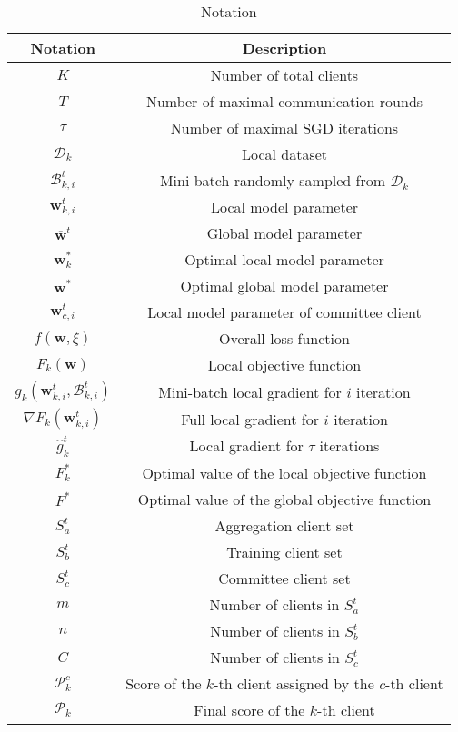 \documentclass[10pt,journal,compsoc]{IEEEtran}
\newcommand{\w}{\mathbf{w}}
\newcommand{\D}{\mathcal{D}}
\newcommand{\B}{\mathcal{B}}
\newcommand{\p}{\mathcal{P}}
\begin{document}
\begin{table}[h]
\caption{Notation}
\label{notation}
\centering
\begin{tabular}{c c}
\toprule
  Notation & Description \\
  \midrule
  $K$ & Number of total clients \\
  $T$ & Number of maximal communication rounds \\ 
  $\tau$ & Number of maximal SGD iterations\\
  $\D_k$ & Local dataset\\
  $\B_{k,i}^{t}$ & Mini-batch randomly sampled from $\D_k$\\
  $\w_{k,i}^{t}$ & Local model parameter\\
  $\overline{\w}^{t}$ & Global model parameter\\
  $\w_k^*$ & Optimal local model parameter\\
  $\w^*$ & Optimal global model parameter\\
  $\w_{c,i}^{t}$ & Local model parameter of committee client\\
  $f(\w,\xi)$ & Overall loss function\\
  $F_k(\w)$ & Local objective function\\
  $g_k(\w_{k,i}^{t},\B_{k,i}^{t})$ & Mini-batch local gradient for $i$ iteration\\
  $\nabla F_k(\w_{k,i}^{t})$ & Full local gradient for $i$ iteration\\
  $\hat{g}_k^t$ & Local gradient for $\tau$ iterations\\
  $F^*_k$ & Optimal value of the local objective function\\
  $F^*$ & Optimal value of the global objective function\\
  $S_a^{t}$ & Aggregation client set\\
  $S_b^{t}$ & Training client set\\
  $S_c^{t}$ & Committee client set\\
  $m$ & Number of clients in $S_a^{t}$\\
  $n$ & Number of clients in $S_b^{t}$\\
  $C$ & Number of clients in $S_c^{t}$\\
  $\p_k^c$ & Score of the $k$-th client assigned by the $c$-th client\\
  $\p_k$ & Final score of the $k$-th client\\
\bottomrule
\end{tabular}

\end{table}
\end{document}
